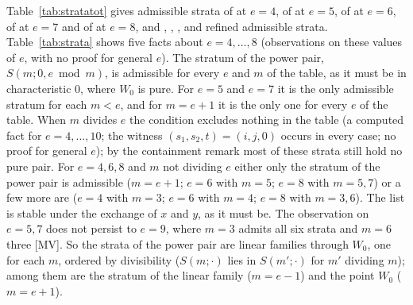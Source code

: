 \documentclass[11pt]{article}
\theoremstyle{definition}
\theoremstyle{remark}
\begin{document}
\begin{table}[htbp]
\centering\footnotesize

\caption{Strata $S(m;i,j)$ of degree $e$ with $2\le m\le e+1$ and $i\le j$, the number that is admissible (some $(s_1,s_2,t)$ makes every $H_k(n)$ nonnegative on the range of Definition~\ref{def:admissible}) and the number that is refined admissible (the stratum and every stratum that contains it admissible), for $e=4,\dots,8$, computed from the definition by the script of the paper.}
\label{tab:stratatot}
\end{table}

\begin{table}[htbp]
\centering\footnotesize

\caption{The admissible and the refined admissible strata of degree $e=4,\dots,8$ for each modulus $m$ with $2\le m\le e+1$: the number of strata $S(m;i,j)$ with $i\le j$, the number and the list of the admissible ones, and the number and the list of the refined admissible ones, computed from the definition by the script of the paper; ``all $N$'' means every stratum of that modulus.}
\label{tab:strata}
\end{table}

Table~\ref{tab:stratatot} gives \nstrataAdmFour{} admissible strata of \nstrataTotalFour{} at $e=4$, \nstrataAdmFive{} of \nstrataTotalFive{} at $e=5$, \nstrataAdmSix{} of \nstrataTotalSix{} at $e=6$, \nstrataAdmSeven{} of \nstrataTotalSeven{} at $e=7$ and \nstrataAdmEight{} of \nstrataTotalEight{} at $e=8$, and \nstrataRefFour{}, \nstrataRefFive{}, \nstrataRefSix{}, \nstrataRefSeven{} and \nstrataRefEight{} refined admissible strata. Table~\ref{tab:strata} shows five facts about $e=4,\dots,8$ (observations on these values of $e$, with no proof for general $e$). The stratum of the power pair, $S(m;0,e\bmod m)$, is admissible for every $e$ and $m$ of the table, as it must be in characteristic $0$, where $W_0$ is pure. For $e=5$ and $e=7$ it is the only admissible stratum for each $m<e$, and for $m=e+1$ it is the only one for every $e$ of the table. When $m$ divides $e$ the condition excludes nothing in the table (a computed fact for $e=4,\dots,10$; the witness $(s_1,s_2,t)=(i,j,0)$ occurs in every case; no proof for general $e$); by the containment remark most of these strata still hold no pure pair. For $e=4,6,8$ and $m$ not dividing $e$ either only the stratum of the power pair is admissible ($m=e+1$; $e=6$ with $m=5$; $e=8$ with $m=5,7$) or a few more are ($e=4$ with $m=3$; $e=6$ with $m=4$; $e=8$ with $m=3,6$). The list is stable under the exchange of $x$ and $y$, as it must be. The observation on $e=5,7$ does not persist to $e=9$, where $m=3$ admits all six strata and $m=6$ three [MV]. So the strata of the power pair are linear families through $W_0$, one for each $m$, ordered by divisibility ($S(m;\cdot)$ lies in $S(m';\cdot)$ for $m'$ dividing $m$); among them are the stratum of the linear family ($m=e-1$) and the point $W_0$ ($m=e+1$).
\end{document}
